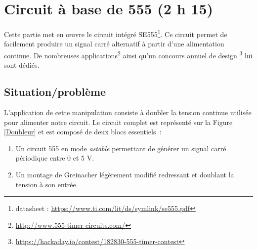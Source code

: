 \documentclass{../../template/labo}
\begin{document}
{

}



\clearpage







\section{Circuit à base de 555 (2 h 15)}
Cette partie met en œuvre le circuit intégré SE555\footnote{datasheet : \url{https://www.ti.com/lit/ds/symlink/se555.pdf}}. Ce circuit permet de facilement produire un signal carré alternatif à partir d'une alimentation continue. De nombreuses applications\footnote{\url{http://www.555-timer-circuits.com/}} ainsi qu'un concours annuel de design \footnote{\url{https://hackaday.io/contest/182830-555-timer-contest}} lui sont dédiés.


\subsection{Situation/problème}

L'application de cette manipulation consiste à doubler la tension continue utilisée pour alimenter notre circuit. Le circuit complet est représenté sur la Figure \ref{Doubleur} et est composé de deux blocs essentiels~:
\begin{enumerate}
	\item Un circuit 555 en mode \textit{astable} permettant de générer un signal carré périodique entre 0 et 5 V.
	\item Un montage de Greinacher légèrement modifié redressant et doublant la tension à son entrée.
\end{enumerate}
\end{document}
